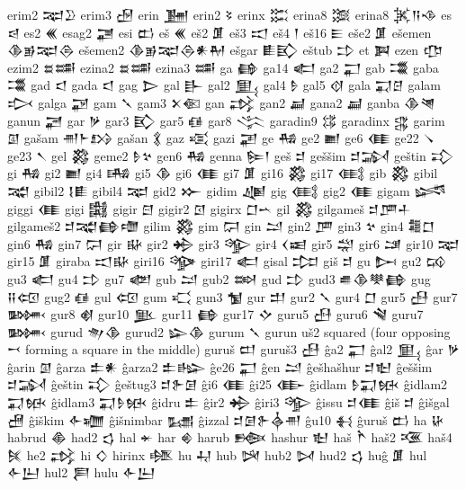  erim2  𒉈𒊒    
 erim3  𒌿   
 erin  𒂞   
 erin2  𒂟   
 erinx  𒈶   
 erina8  𒈷   
 erina8  𒈸𒀀𒈾    
 es  𒁀   
 es2  𒌍   
 esag2  𒃥   
 esi  𒆗   
 eš  𒌍   
 eš2  𒂠   
 eš3  𒀊   
 eš4  𒁹   
 eš16  𒀼   
 eše2  𒂠   
 ešemen  𒆠𒂊𒉈𒁲    
 ešemen2  𒆠𒂊𒉈𒁲𒀭𒈹    
 ešgar  𒀾𒃼    
 eštub  𒄞   
 et  𒀉   
 ezen  𒂡   
 ezim2  𒊺𒌁    
 ezina2  𒊺𒌁    
 ezina3  𒌁   
 ga  𒂵   
 ga14  𒅗   
 ga2  𒂷   
 gab  𒃮   
 gaba  𒃮   
 gad  𒃰   
 gada  𒃰   
 gag  𒆕   
 gal  𒃲   
 gal2  𒅅   
 gal4  𒊩   
 gal5  𒋼   
 gala  𒍑𒆪    
 galam  𒃴   
 galga  𒃌   
 gam  𒃵   
 gam3  𒉽𒈿    
 gan  𒃶   
 gan2  𒃷   
 gana2  𒃷   
 ganba  𒆠𒇴    
 ganun  𒃠   
 gar  𒃻   
 gar3  𒃼   
 gar5  𒈖   
 gar8  𒋞   
 garadin9  𒌏   
 garadinx  𒃱   
 garim  𒇑   
 gašam  𒉣𒈨𒋳    
 gašan  𒃽   
 gaz  𒄤   
 gazi  𒃢   
 ge  𒄀   
 ge2  𒆤   
 ge6  𒈪   
 ge22  𒀺   
 ge23  𒀹   
 gel  𒄃   
 geme2  𒊩𒆳    
 gen6  𒄀   
 genna  𒌉𒁹    
 geš  𒄑   
 geššim  𒄑𒋆    
 geštin  𒃾   
 gi  𒄀   
 gi2  𒆤   
 gi4  𒄄   
 gi5  𒆠   
 gi6  𒈪   
 gi7  𒂠   
 gi16  𒄃   
 gi17  𒍼   
 gib  𒄃   
 gibil  𒉋   
 gibil2  𒋙𒀾    
 gibil4  𒉈   
 gid2  𒁍   
 gidim  𒄇   
 gig  𒍼   
 gig2  𒈪   
 gigam  𒈓   
 giggi  𒈪   
 gigi  𒄅   
 gigir  𒇀   
 gigir2  𒇥   
 gigirx  𒆸𒌀      
 gil  𒄃   
 gilgameš  𒄑𒂆𒈦    
 gilgameš2  𒄑𒉋𒂵𒈩    
 gilim  𒄃   
 gim  𒁶   
 gin  𒁺   
 gin2  𒂆   
 gin3  𒆳   
 gin4  𒍤𒆸    
 gin6  𒄀   
 gin7  𒁶   
 gir  𒄫   
 gir2  𒄈   
 gir3  𒄊   
 gir4  𒌋𒀜    
 gir5  𒁽   
 gir6  𒁼   
 gir10  𒉈   
 gir15  𒂠   
 giraba  𒀊𒄫    
 giri16  𒄌   
 giri17  𒅗   
 gisal  𒄐   
 giš  𒄑   
 gu  𒄖   
 gu2  𒄘   
 gu3  𒅗   
 gu4  𒄞   
 gu7  𒅥   
 gub  𒁺   
 gub2  𒇷   
 gud  𒄞   
 gud3  𒌑𒆠𒋧𒂵    
 gug  𒍝𒄢    
 gug2  𒈖   
 gul  𒄢   
 gum  𒄣   
 gun3  𒁯   
 gur  𒄥   
 gur2  𒃵   
 gur4  𒆸   
 gur5  𒍀   
 gur7  𒄦   
 gur8  𒋽   
 gur10  𒆥   
 gur11  𒂵   
 gur17  𒄕   
 guru5  𒍀   
 guru6  𒃸   
 guru7  𒄦   
 gurud  𒉩𒆠    
 gurud2  𒇽𒆠    
 gurum  𒃵   
 gurun  uš2 squared (four opposing 𒍗 forming a square in the  
   middle)   
 guruš  𒄨   
 guruš3  𒍀   
 ĝa2  𒂷   
 ĝal2  𒅅   
 ĝar  𒃻   
 ĝarin  𒇑   
 ĝarza  𒉺𒀭    
 ĝarza2  𒉺𒈗    
 ĝe26  𒂷   
 ĝen  𒁺   
 ĝešhašhur  𒄑𒈢    
 ĝeššim  𒄑𒋆    
 ĝeštin  𒃾   
 ĝeštug3  𒄑𒉿𒌆    
 ĝi6  𒈪   
 ĝi25  𒂂   
 ĝidlam  𒊩𒍑𒁮    
 ĝidlam2  𒍑𒁮    
 ĝidlam3  𒍑𒊩𒁮    
 ĝidru  𒉺   
 ĝir2  𒄈   
 ĝiri3  𒄊   
 ĝissu  𒄑𒈪    
 ĝiš  𒄑   
 ĝišgal  𒍇   
 ĝiškim  𒅆𒁾    
 ĝišnimbar  𒊷   
 ĝizzal  𒄑𒌆𒉿𒎓𒉣    
 ĝu10  𒈬   
 ĝuruš  𒆗   
 ha  𒄩   
 habrud  𒆢   
 had2  𒌓   
 hal  𒄬   
 har  𒄯   
 harub  𒁬   
 hashur  𒈢   
 haš  𒋻   
 haš2  𒍨   
 haš4  𒍮   
 he2  𒃶   
 hi  𒄭   
 hirinx  𒆶   
 hu  𒄷   
 hub  𒄽   
 hub2  𒄸   
 hud2  𒌓   
 huĝ  𒂠   
 hul  𒅆𒌨    
 hul2  𒄾   
 hulu  𒅆𒌨    
